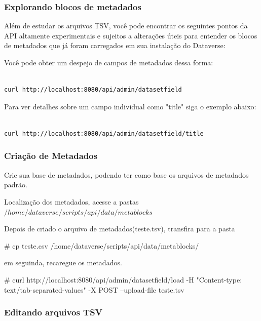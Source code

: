 \documentclass[12pt,hidelinks]{article}
\begin{document}
\subsubsection{Explorando blocos de metadados}

\qquad Além de estudar os arquivos TSV, você pode encontrar os seguintes pontos da API altamente experimentais e sujeitos a alterações úteis para entender os blocos de metadados que já foram carregados em sua instalação do Dataverse:

Você pode obter um despejo de campos de metadados dessa forma:

\begin{verbatim}

curl http://localhost:8080/api/admin/datasetfield

\end{verbatim}

Para ver detalhes sobre um campo individual como "title" siga o exemplo abaixo:

\begin{verbatim}

curl http://localhost:8080/api/admin/datasetfield/title

\end{verbatim}

\subsubsection{Criação de Metadados}
        
        \qquad Crie sua base de metadados, podendo ter como base os arquivos de metadados padrão.
        
    Localização dos metadados, acesse a pastas $/home/dataverse/scripts/api/data/metablocks$
        
        
        Depois de criado o arquivo de metadados(teste.tsv), transfira para a pasta
        
         \# cp teste.csv /home/dataverse/scripts/api/data/metablocks/
    
        
        em seguinda, recaregue os metadados.
        
         \# curl http://localhost:8080/api/admin/datasetfield/load -H "Content-type: text/tab-separated-values" -X POST --upload-file teste.tsv
        

\subsubsection{Editando arquivos TSV}
\end{document}
